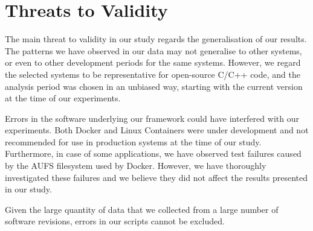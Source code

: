 \section{Threats to Validity}
\label{evolution:threats}

The main threat to validity in our study regards the generalisation of
our results.  The patterns we have observed in our data may not
generalise to other systems, or even to other development periods
for the same systems.  However, we regard the selected systems to be
representative for open-source C/C++ code, and the analysis period was
chosen in an unbiased way, starting with the current version at the
time of our experiments.

Errors in the software underlying our framework could have interfered with
our experiments. Both Docker and Linux Containers were under development
and not recommended for use in production systems at the time of our study.
Furthermore, in case of some applications, we have observed test failures
caused by the AUFS filesystem used by Docker. However, we have thoroughly
investigated these failures and we believe they did not affect the results
presented in our study.

Given the large quantity of data that we collected from a large number
of software revisions, errors in our scripts cannot be excluded.


